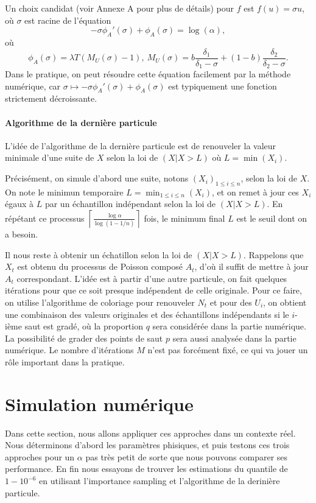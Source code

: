 \documentclass{article}
\begin{document}
Un choix candidat (voir Annexe A pour plus de détails) pour $f$ est $f(u)=\sigma u$, où $\sigma$ est racine de l'équation
\[-\sigma \phi_A'(\sigma)+\phi_A(\sigma)=\log(\alpha),\]
où
\[\phi_A(\sigma)=\lambda T(M_U(\sigma)-1),\ M_U(\sigma)=b\frac{\delta_1}{\delta_1-\sigma}+(1-b)\frac{\delta_2}{\delta_2-\sigma}.\]
Dans le pratique, on peut résoudre cette équation facilement par la méthode numérique, car $\sigma\mapsto -\sigma \phi_A'(\sigma)+\phi_A(\sigma)$ est typiquement une fonction strictement décroissante.
\paragraph{Algorithme de la dernière particule}

L'idée de l'algorithme de la dernière particule est de renouveler la valeur minimale d'une suite de $X$ selon la loi de $(X|X>L)$ où $L=\min(X_i)$. 

Précisément, on simule d'abord une suite, notons $(X_i)_{1\leq i\leq n}$, selon la loi de $X$. On note le minimun temporaire $L=\min_{1\leq i\leq n}(X_i)$, et on remet à jour ces $X_i$ égaux à $L$ par un échantillon indépendant selon la loi de $(X|X>L)$. En répétant ce processus $\displaystyle \left\lceil\frac{\log \alpha}{\log(1-1/n)}\right\rceil$ fois, le minimum final $L$ est le seuil dont on a besoin.

Il nous reste à obtenir un échatillon selon la loi de $(X|X>L)$. Rappelons que $X_t$ est obtenu du processus de Poisson composé $A_t$, d'où il suffit de mettre à jour $A_t$ correspondant. L'idée est à partir d'une autre particule, on fait quelques itérations pour que ce soit presque indépendent de celle originale. Pour ce faire, on utilise l'algorithme de coloriage pour renouveler $N_t$ et pour des $U_i$, on obtient une combinaison des valeurs originales et des échantillons indépendants si le $i$-ième saut est gradé, où la proportion $q$ sera considérée dans la partie numérique. La possibilité de grader des points de saut $p$ sera aussi analysée dans la partie numérique. Le nombre d'itérations $M$ n'est pas forcément fixé, ce qui va jouer un rôle important dans la pratique.



\section{Simulation numérique} 
Dans cette section, nous allons appliquer ces approches dans un contexte réel. Nous déterminons d'abord les paramètres phisiques, et puis testons ces trois approches pour un $\alpha$ pas très petit de sorte que nous pouvons comparer ses performance. En fin nous essayons de trouver les estimations du quantile de $1-10^{-6}$ en utilisant l'importance sampling et l'algorithme de la derinière particule.
\end{document}
